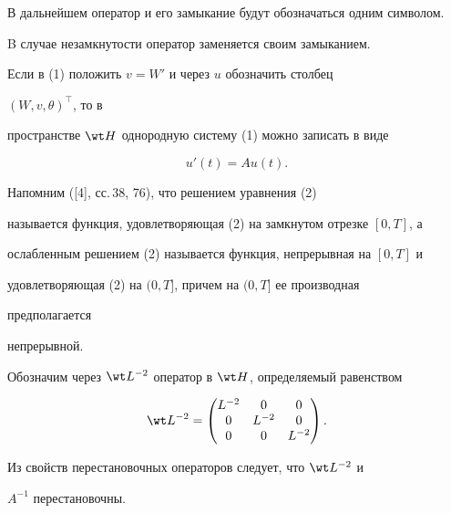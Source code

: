  


 


В дальнейшем оператор и его замыкание будут обозначаться одним символом. 


B случае незамкнутости оператор заменяется своим замыканием. 


 


Если в (1) положить $v=W'$ и через $u$ обозначить столбец 


$(W,v,\theta)^\top$, то в 


пространстве $\wt H$ однородную систему (1) можно записать в виде 


\begin{equation} 


u'(t)=Au(t). 


\end{equation} 


 


Напомним ([4], сс.\,38, 76), что решением уравнения (2) 


называется функция, удовлетворяющая (2) на замкнутом отрезке $[0,T]$, а 


ослабленным решением (2) называется функция, непрерывная на $[0,T]$ и 


удовлетворяющая (2) на $(0,T]$, причем на $(0,T]$ ее производная 


предполагается 


непрерывной. 


 


 


Обозначим через $\wt L{}^{-2}$ оператор в $\wt H$, определяемый равенством 


$$ 


\wt L{}^{-2}= 


\begin{pmatrix} 


L^{-2} & 0 & 0 \\ 0 & L^{-2} & 0 \\ 0 & 0 & L^{-2} 


\end{pmatrix} 


. 


$$ 


Из свойств перестановочных операторов следует, что $\wt L{}^{-2}$ и


$A^{-1}$ перестановочны. 


 


